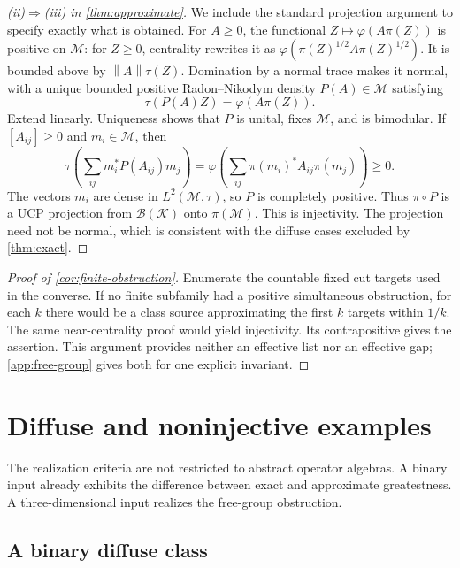 \documentclass[11pt,reqno]{amsart}
\theoremstyle{definition}
\theoremstyle{remark}
\numberwithin{equation}{section}
\newcommand{\M}{\mathcal M}
\newcommand{\B}{\mathcal B}
\newcommand{\norm}[1]{\left\lVert#1\right\rVert}
\begin{document}
\begin{proof}[\textup{(ii)}$\Rightarrow$\textup{(iii)} in \cref{thm:approximate}]
We include the standard projection argument to specify exactly what is obtained. For $A\ge0$, the functional $Z\mapsto\varphi(A\pi(Z))$ is positive on $\M$: for $Z\ge0$, centrality rewrites it as $\varphi(\pi(Z)^{1/2}A\pi(Z)^{1/2})$. It is bounded above by $\norm A\tau(Z)$. Domination by a normal trace makes it normal, with a unique bounded positive Radon--Nikodym density $P(A)\in\M$ satisfying
\[
 \tau(P(A)Z)=\varphi(A\pi(Z)).
\]
Extend linearly. Uniqueness shows that $P$ is unital, fixes $\M$, and is bimodular. If $[A_{ij}]\ge0$ and $m_i\in\M$, then
\[
 \tau\!\left(\sum_{ij}m_i^*P(A_{ij})m_j\right)
 =\varphi\!\left(\sum_{ij}\pi(m_i)^*A_{ij}\pi(m_j)\right)\ge0.
\]
The vectors $m_i$ are dense in $L^2(\M,\tau)$, so $P$ is completely positive. Thus $\pi\circ P$ is a UCP projection from $\B(\mathcal K)$ onto $\pi(\M)$. This is injectivity. The projection need not be normal, which is consistent with the diffuse cases excluded by \cref{thm:exact}.
\end{proof}

\begin{proof}[Proof of \cref{cor:finite-obstruction}]
Enumerate the countable fixed cut targets used in the converse. If no finite subfamily had a positive simultaneous obstruction, for each $k$ there would be a class source approximating the first $k$ targets within $1/k$. The same near-centrality proof would yield injectivity. Its contrapositive gives the assertion. This argument provides neither an effective list nor an effective gap; \cref{app:free-group} gives both for one explicit invariant.
\end{proof}



\section{Diffuse and noninjective examples}\label{sec:examples}

The realization criteria are not restricted to abstract operator algebras. A binary input already exhibits the difference between exact and approximate greatestness. A three-dimensional input realizes the free-group obstruction.

\subsection{A binary diffuse class}
\end{document}
